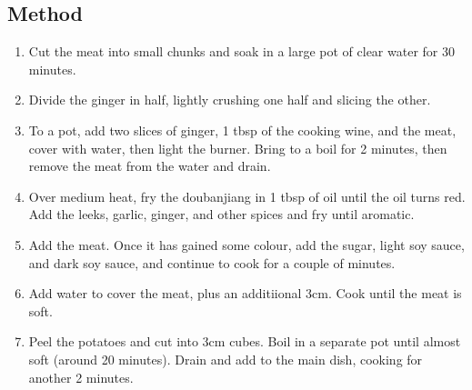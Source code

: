 \begin{multicols}{2}
  \subsection{Method}
    \begin{enumerate}
      \item Cut the meat into small chunks and soak in a large pot of clear water for 30 minutes.
      \item Divide the ginger in half, lightly crushing one half and slicing the other.
      \item To a pot, add two slices of ginger, 1 tbsp of the cooking wine, and the meat, cover with water, then light the burner. Bring to a boil for 2 minutes, then remove the meat from the water and drain.
      \item Over medium heat, fry the doubanjiang in 1 tbsp of oil until the oil turns red. Add the leeks, garlic, ginger, and other spices and fry until aromatic.
      \item Add the meat. Once it has gained some colour, add the sugar, light soy sauce, and dark soy sauce, and continue to cook for a couple of minutes.
      \item Add water to cover the meat, plus an additiional 3cm. Cook until the meat is soft.
      \item Peel the potatoes and cut into 3cm cubes. Boil in a separate pot until almost soft (around 20 minutes). Drain and add to the main dish, cooking for another 2 minutes.
    \end{enumerate}
  \end{multicols}

